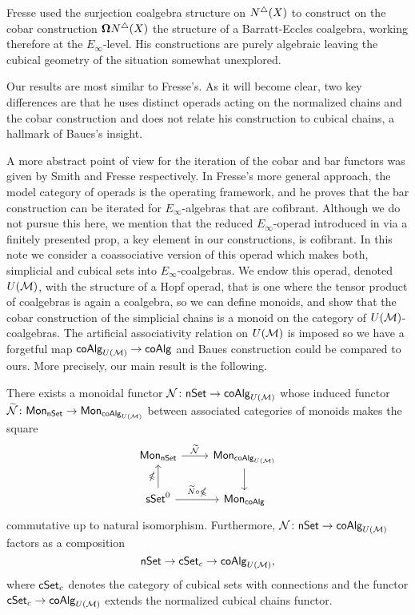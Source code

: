 Fresse \cite{Fresse03construction} used the surjection coalgebra structure on $N^{\triangle}(X)$ to construct on the cobar construction $\mathbf{\Omega}N^{\triangle}(X)$ the  structure of a Barratt-Eccles coalgebra, working therefore at the $E_\infty$-level. His constructions are purely algebraic leaving the cubical geometry of the situation somewhat unexplored.

Our results are most similar to Fresse's.
As it will become clear, two key differences are that he uses distinct operads acting on the normalized chains and the cobar construction and does not relate his construction to cubical chains, a hallmark of Baues's insight.

A more abstract point of view for the iteration of the cobar and bar functors was given by Smith \cite{Smith94cobar} and Fresse \cite{Fresse10complex} respectively. 
In Fresse's more general approach, the model category of operads is the operating framework, and he proves that the bar construction can be iterated for $E_\infty$-algebras that are cofibrant. Although we do not pursue this here, we mention that the reduced $E_\infty$-operad introduced in \cite{Medina20prop1} via a finitely presented prop, a key element in our constructions, is cofibrant.
In this note we consider a coassociative version of this operad which makes both, simplicial and cubical sets into $E_\infty$-coalgebras.
We endow this operad, denoted $U(\mathcal{M})$, with the structure of a Hopf operad, that is one where the tensor product of coalgebras is again a coalgebra, so we can define monoids, and show that the cobar construction of the simplicial chains is a monoid on the category of $U(\mathcal{M})$-coalgebras.
The artificial associativity relation on $U(\mathcal{M})$ is imposed so we have a forgetful map $\mathsf{coAlg}_{U(\mathcal{M})} \to \mathsf{coAlg}$ and Baues construction could be compared to ours. More precisely, our main result is the following.

\begin{theorem}
There exists a monoidal functor $\mathcal{N} \colon \mathsf{nSet} \to \mathsf{coAlg}_{U(\mathcal{M})}$ whose induced functor $\widetilde{\mathcal{N}} \colon \mathsf{Mon}_{\mathsf{nSet}} \to \mathsf{Mon}_{\mathsf{coAlg}_{U(\mathcal{M})}}$ between associated categories of monoids makes the square
\begin{equation*}
\begin{tikzcd}
\Mon_{\nSet} \arrow[r, "\widetilde{\mathcal{N}}"] & \Mon_{\coAlg_{U(\M)}} \arrow[d]\\
\sSet^0 \arrow[r, "\widetilde{N} \circ \gcobar"] \arrow[u, "\gcobar"] & \Mon_{\coAlg}
\end{tikzcd}
\end{equation*}
commutative up to natural isomorphism. Furthermore, $\mathcal{N} \colon \mathsf{nSet} \to \mathsf{coAlg}_{U(\mathcal{M})}$ factors as a composition $$\mathsf{nSet} \to \mathsf{cSet}_c \to \mathsf{coAlg}_{U(\mathcal{M})},$$ where $\mathsf{cSet}_c$ denotes the category of cubical sets with connections and the functor $\mathsf{cSet}_c \to \mathsf{coAlg}_{U(\mathcal{M})}$ extends the normalized cubical chains functor. 
\end{theorem} 

